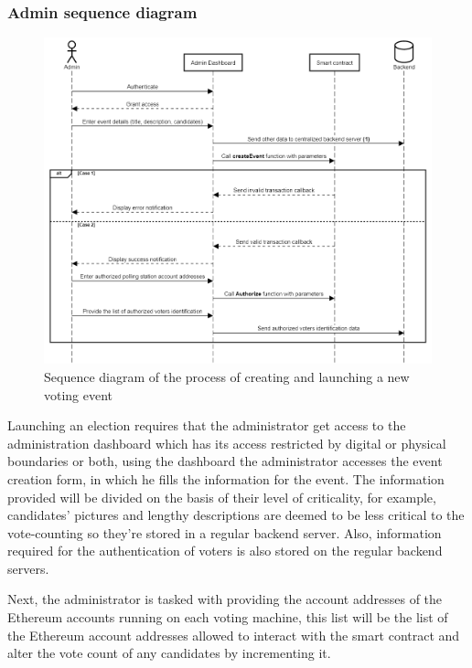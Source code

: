 \subsubsection{Admin sequence diagram}

\begin{figure}[H]
	\centering
		\includegraphics[width=14cm]{images/chapter3/admin_sequence_diagram.png}
		\caption{{\footnotesize Sequence diagram of the process of creating and launching a new voting event}}
\end{figure}

Launching an election requires that the administrator get access to the administration dashboard which has its access restricted by digital or physical boundaries or both, using the dashboard the administrator accesses the event creation form, in which he fills the information for the event. The information provided will be divided on the basis of their level of criticality, for example, candidates' pictures and lengthy descriptions are deemed to be less critical to the vote-counting so they're stored in a regular backend server. Also, information required for the authentication of voters is also stored on the regular backend servers.

Next, the administrator is tasked with providing the account addresses of the Ethereum accounts running on each voting machine, this list will be the list of the Ethereum account addresses allowed to interact with the smart contract and alter the vote count of any candidates by incrementing it.

